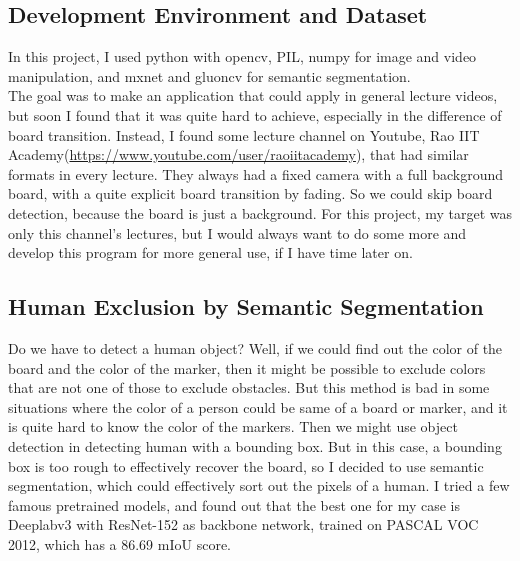 \documentclass[a4paper]{article}
\begin{document}
\subsection{Development Environment and Dataset}
In this project, I used python with opencv, PIL, numpy for image and video manipulation, and mxnet and gluoncv for semantic segmentation. \\
The goal was to make an application that could apply in general lecture videos, but soon I found that it was quite hard to achieve, especially in the difference of board transition. Instead, I found some lecture channel on Youtube, Rao IIT Academy(\url{https://www.youtube.com/user/raoiitacademy}), that had similar formats in every lecture. They always had a fixed camera with a full background board, with a quite explicit board transition by fading. So we could skip board detection, because the board is just a background. For this project, my target was only this channel's lectures, but I would always want to do some more and develop this program for more general use, if I have time later on.
\subsection{Human Exclusion by Semantic Segmentation}
Do we have to detect a human object? Well, if we could find out the color of the board and the color of the marker, then it might be possible to exclude colors that are not one of those to exclude obstacles. But this method is bad in some situations where the color of a person could be same of a board or marker, and it is quite hard to know the color of the markers. Then we might use object detection in detecting human with a bounding box. But in this case, a bounding box is too rough to effectively recover the board, so I decided to use semantic segmentation, which could effectively sort out the pixels of a human. I tried a few famous pretrained models, and found out that the best one for my case is Deeplabv3 with ResNet-152 as backbone network, trained on PASCAL VOC 2012, which has a 86.69 mIoU score.\cite{c1}
\begin{figure}[H]
\centering
{}
\end{figure}
\end{document}
